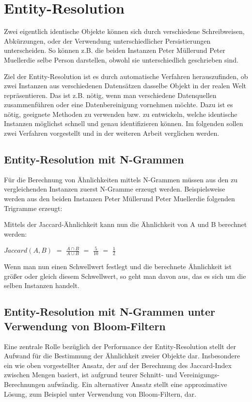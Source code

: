\section{Entity-Resolution}
\label{sec:approaches}

Zwei eigentlich identische Objekte können sich durch verschiedene Schreibweisen,
Abkürzungen, oder der Verwendung unterschiedlicher Persistierungen unterscheiden.
So können z.B. die beiden Instanzen \glqq Peter Müller\grqq und \glqq Peter Mueller\grqq die selbe Person darstellen,
obwohl sie unterschiedlich geschrieben sind.

Ziel der Entity-Resolution ist es durch automatische Verfahren herauszufinden,
ob zwei Instanzen aus verschiedenen Datensätzen dasselbe Objekt in der realen Welt repräsentieren.
Das ist z.B. nötig, wenn man verschiedene Datenquellen zusammenführen oder eine Datenbereinigung vornehmen möchte.
Dazu ist es nötig, geeignete Methoden zu verwenden bzw. zu entwickeln,
welche identische Instanzen möglichst schnell und genau identifizieren können.
Im folgenden sollen zwei Verfahren vorgestellt und in der weiteren Arbeit verglichen werden.

\subsection{Entity-Resolution mit N-Grammen}
\label{sec:approaches:n-gramm}

Für die Berechnung von Ähnlichkeiten mittels N-Grammen müssen aus den zu vergleichenden Instanzen zuerst N-Gramme erzeugt werden.
Beispielsweise werden aus den beiden Instanzen \glqq Peter Müller\grqq und \glqq Peter Mueller\grqq die folgenden Trigramme erzeugt:


Mittels der Jaccard-Ähnlichkeit kann nun die Ähnlichkeit von A und B berechnet werden:

$Jaccard(A, B)$ $=$ $\frac{A \cap B}{A \cup B}$ $=$ $\frac{5}{10}$ $=$ $\frac{1}{2}$

Wenn man nun einen Schwellwert festlegt und die berechnete Ähnlichkeit ist größer oder gleich diesem Schwellwert,
so geht man davon aus, das es sich um die selben Instanzen handelt.

\subsection{Entity-Resolution mit N-Grammen unter Verwendung von Bloom-Filtern}
\label{sec:approaches:bloom}

Eine zentrale Rolle bezüglich der Performance der Entity-Resolution stellt der Aufwand für die Bestimmung der Ähnlichkeit zweier Objekte dar.
Insbesondere ein wie oben vorgestellter Ansatz, der auf der Berechnung des Jaccard-Index zwischen Mengen basiert,
ist aufgrund teurer Schnitt- und Vereinigungs-Berechnungen aufwändig.
Ein alternativer Ansatz stellt eine approximative Lösung, zum Beispiel unter Verwendung von Bloom-Filtern, dar.

